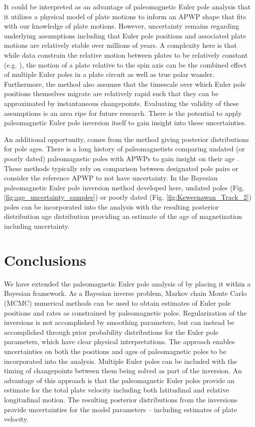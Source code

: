 \documentclass[]{agujournal2019}
\begin{document}
It could be interpreted as an advantage of paleomagnetic Euler pole analysis that it utilizes a physical model of plate motions to inform an APWP shape that fits with our knowledge of plate motions. However, uncertainty remains regarding underlying assumptions including that Euler pole positions and associated plate motions are relatively stable over millions of years. A complexity here is that while data constrain the relative motion between plates to be relatively constant (e.g. ), the motion of a plate relative to the spin axis can be the combined effect of multiple Euler poles in a plate circuit as well as true polar wander. Furthermore, the method also assumes that the timescale over which Euler pole positions themselves migrate are relatively rapid such that they can be approximated by instantaneous changepoints. Evaluating the validity of these assumptions is an area ripe for future research. There is the potential to apply paleomagnetic Euler pole inversion itself to gain insight into these uncertainties.

An additional opportunity, comes from the method giving posterior distributions for pole ages. There is a long history of paleomagnetists comparing undated (or poorly dated) paleomagnetic poles with APWPs to gain insight on their age \cite{McCabe1984b, Hnatyshin2014a}. These methods typically rely on comparison between designated pole pairs or consider the reference APWP to not have uncertainty. In the Bayesian paleomagnetic Euler pole inversion method developed here, undated poles (Fig. \ref{fig:age_uncertainty_samples}) or poorly dated (Fig. \ref{fig:Keweenawan_Track_2}) poles can be incorporated into the analysis with the resulting posterior distribution age distribution providing an estimate of the age of magnetization including uncertainty. 

\section*{Conclusions}
\label{sec:conclusions}

We have extended the paleomagnetic Euler pole analysis of  by placing it within a Bayesian framework. As a Bayesian inverse problem, Markov chain Monte Carlo (MCMC) numerical methods can be used to obtain estimates of Euler pole positions and rates as constrained by paleomagnetic poles. Regularization of the inversions is not accomplished by smoothing parameters, but can instead be accomplished through prior probability distributions for the Euler pole parameters, which have clear physical interpretations. The approach enables uncertainties on both the positions and ages of paleomagnetic poles to be incorporated into the analysis. Multiple Euler poles can be included with the timing of changepoints between them being solved as part of the inversion. An advantage of this approach is that the paleomagnetic Euler poles provide an estimate for the total plate velocity including both latitudinal and relative longitudinal motion. The resulting posterior distributions from the inversions provide uncertainties for the model parameters -- including estimates of plate velocity. 
\end{document}
